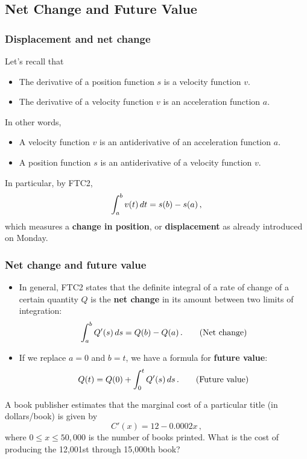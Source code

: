 \documentclass[10pt,t,handout,ignorenonframetext,aspectratio=169]{beamer}
\begin{document}
\subsection{Net Change and Future Value}
\begin{frame}
  \frametitle{Displacement and net change}
  Let's recall that
  \begin{itemize}
  \item The derivative of a position function $s$ is a velocity function $v$.
  \item The derivative of a velocity function $v$ is an acceleration function $a$.
  \end{itemize}

  In other words,
  \begin{itemize}
  \item A velocity function $v$ is an antiderivative of an acceleration function $a$.
  \item A position function $s$ is an antiderivative of a velocity function $v$.
  \end{itemize}

  In particular, by FTC2,
  \[
    \int_a^b v(t) \mathop{}\!d t = s(b) - s(a) \,,
  \]
  which measures a \textbf{change in position}, or \textbf{displacement} as already introduced on Monday.
\end{frame}


\begin{frame}
  \frametitle{Net change and future value}
  \begin{itemize}
  \item In general, FTC2 states that the definite integral of a rate
    of change of a certain quantity $Q$ is the \textbf{net change} in
    its amount between two limits of integration:
    \[
      \int_a^b Q'(s) \mathop{}\!d s = Q(b) - Q(a) \,. \tag{Net change}
    \]
  \item If we replace $a = 0$ and $b = t$, we have a formula for \textbf{future value}:
    \[
      Q(t) = Q(0) + \int_0^t Q'(s) \mathop{}\!d s \,. \tag{Future value}
    \]
  \end{itemize}
\end{frame}


\begin{frame}
  \vs
  \question{}
  A book publisher estimates that the marginal cost of a particular
  title (in dollars/book) is given by
  \[
    C'(x) = 12 - 0.0002x \,,
  \]
  where $0 \le x \le 50,000$ is the number of books printed. What is the
  cost of producing the 12,001st through 15,000th book?
\end{frame}
\end{document}

